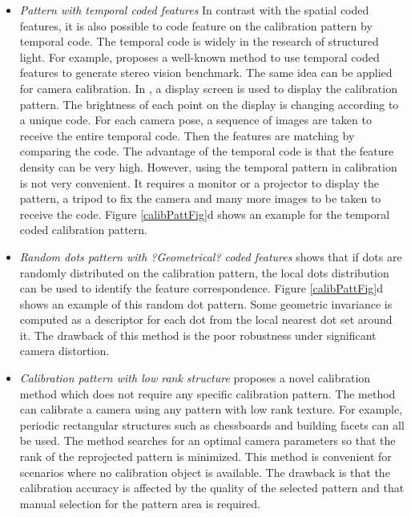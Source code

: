 \documentclass{report}
\begin{document}
\begin{itemize}
	\item \textit{Pattern with temporal coded features} In contrast with the spatial coded features, it is also possible to code feature on the calibration pattern by temporal code. The temporal code is widely in the research of structured light. For example, \cite{scharstein2003high} proposes a well-known method to use temporal coded features to generate stereo vision benchmark. The same idea can be applied for camera calibration. In \cite{grosse2012camera, schmalz2011camera}, a display screen is used to display the calibration pattern. The brightness of each point on the display is changing according to a unique code. For each camera pose, a sequence of images are taken to receive the entire temporal code. Then the features are matching by comparing the code. The advantage of the temporal code is that the feature density can be very high. However, using the temporal pattern in calibration is not very convenient. It requires a monitor or a projector to display the pattern, a tripod to fix the camera and many more images to be taken to receive the code. Figure \ref{calibPattFig}d shows an example for the temporal coded calibration pattern. 
	\item \textit{Random dots pattern with ?Geometrical? coded features} \cite{oyamadasingle} shows that if dots are randomly distributed on the calibration pattern, the local dots distribution can be used to identify the feature correspondence. Figure \ref{calibPattFig}d shows an example of this random dot pattern. Some geometric invariance is computed as a descriptor for each dot from the local nearest dot set around it. The drawback of this method is the poor robustness under significant camera distortion. 
	\item \textit{Calibration pattern with low rank structure} \cite{zhang2011camera} proposes a novel calibration method which does not require any specific calibration pattern. The method can calibrate a camera using any pattern with low rank texture. For example, periodic rectangular structures such as chessboards and building facets can all be used. The method searches for an optimal camera parameters so that the rank of the reprojected pattern is minimized. This method is convenient for scenarios where no calibration object is available. The drawback is that the calibration accuracy is affected by the quality of the selected pattern and that manual selection for the pattern area is required. 
\end{itemize}
\end{document}
